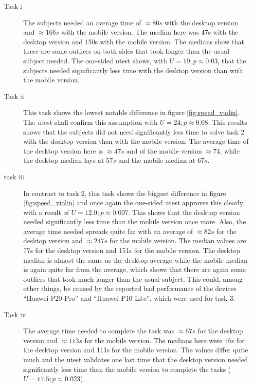 \begin{description}
  \item[Task i] The subjects needed an average time of $\approx 80s$ with the desktop version and $\approx 166s$ with the mobile version. 
  The median here was 47s with the desktop version and 150s with the mobile version. 
  The medians show that there are some outliers on both sides that took longer than the usual subject needed. 
  The one-sided \gls{utest} shows, with $U = 19; p \approx 0.03$, that the subjects needed significantly less time with the desktop version than with the mobile version.
  \item[Task ii] This task shows the lowest notable difference in figure \ref{fig:speed_violin}. 
  The \gls{utest} shall confirm this assumption with $U=24; p \approx 0.08$.
  This results shows that the subjects did not need significantly less time to solve task 2 with the desktop version than with the mobile version.
  The average time of the desktop version here is $\approx 47s$ and of the mobile version $\approx 74$, while the desktop median lays at $57s$ and the mobile median at $67s$.
  \item[task iii] In contrast to task 2, this task shows the biggest difference in figure \ref{fig:speed_violin} and once again the one-sided \gls{utest} approves this clearly with a result of $U=12.0;p \approx 0.007$. 
  This shows that the desktop version needed significantly less time than the mobile version once more. 
  Also, the average time needed spreads quite far with an average of $\approx 82s$ for the desktop version and $\approx 247s$ for the mobile version.
  The median values are 77s for the desktop version and 151s for the mobile version.
  The desktop median is almost the same as the desktop average while the mobile median is again quite far from the average, which shows that there are again some outliers that took much longer than the usual subject. 
  This could, among other things, be caused by the reported bad performance of the devices \enquote{Huawei P20 Pro} and \enquote{Huawei P10 Lite}, which were used for task 3.
  \item[Task iv] The average time needed to complete the task was $\approx 67s$ for the desktop version and $\approx 113s$ for the mobile version. 
  The medians here were 46s for the desktop version and 111s for the mobile version. 
  The values differ quite much and the \gls{utest} validates one last time that the desktop version needed significantly less time than the mobile version to complete the tasks ($U=17.5;p \approx 0.023$).
\end{description}

